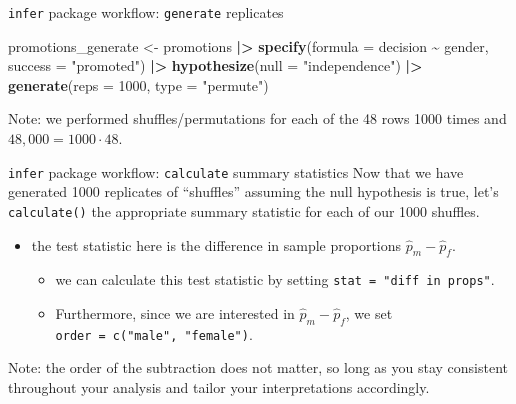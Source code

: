 \documentclass[
  ignorenonframetext,
]{beamer}
\newenvironment{Shaded}{\begin{snugshade}}{\end{snugshade}}
\newcommand{\AttributeTok}[1]{\textcolor[rgb]{0.13,0.29,0.53}{#1}}
\newcommand{\DecValTok}[1]{\textcolor[rgb]{0.00,0.00,0.81}{#1}}
\newcommand{\FunctionTok}[1]{\textcolor[rgb]{0.13,0.29,0.53}{\textbf{#1}}}
\newcommand{\NormalTok}[1]{#1}
\newcommand{\OtherTok}[1]{\textcolor[rgb]{0.56,0.35,0.01}{#1}}
\newcommand{\SpecialCharTok}[1]{\textcolor[rgb]{0.81,0.36,0.00}{\textbf{#1}}}
\newcommand{\StringTok}[1]{\textcolor[rgb]{0.31,0.60,0.02}{#1}}
\providecommand{\tightlist}{%
  \setlength{\itemsep}{0pt}\setlength{\parskip}{0pt}}
\begin{document}
\begin{frame}[fragile]{\texttt{infer} package workflow:
\texttt{generate} replicates}
\protect\hypertarget{infer-package-workflow-generate-replicates-1}{}
\begin{Shaded}
\begin{Highlighting}[]
\NormalTok{promotions\_generate }\OtherTok{\textless{}{-}}\NormalTok{ promotions }\SpecialCharTok{|\textgreater{}} 
  \FunctionTok{specify}\NormalTok{(}\AttributeTok{formula =}\NormalTok{ decision }\SpecialCharTok{\textasciitilde{}}\NormalTok{ gender, }
          \AttributeTok{success =} \StringTok{"promoted"}\NormalTok{) }\SpecialCharTok{|\textgreater{}} 
  \FunctionTok{hypothesize}\NormalTok{(}\AttributeTok{null =} \StringTok{"independence"}\NormalTok{) }\SpecialCharTok{|\textgreater{}} 
  \FunctionTok{generate}\NormalTok{(}\AttributeTok{reps =} \DecValTok{1000}\NormalTok{, }\AttributeTok{type =} \StringTok{"permute"}\NormalTok{)}
\end{Highlighting}
\end{Shaded}

Note: we performed shuffles/permutations for each of the 48 rows 1000
times and \(48,000=1000\cdot 48\).
\end{frame}

\begin{frame}[fragile]{\texttt{infer} package workflow:
\texttt{calculate} summary statistics}
\protect\hypertarget{infer-package-workflow-calculate-summary-statistics}{}
Now that we have generated 1000 replicates of ``shuffles'' assuming the
null hypothesis is true, let's \texttt{calculate()} the appropriate
summary statistic for each of our 1000 shuffles.

\begin{itemize}
\item
  the test statistic here is the difference in sample proportions
  \(\hat{p}_m-\hat{p}_f\).

  \begin{itemize}
  \tightlist
  \item
    we can calculate this test statistic by setting
    \texttt{stat\ =\ "diff\ in\ props"}.
  \item
    Furthermore, since we are interested in \(\hat{p}_m-\hat{p}_f\), we
    set \texttt{order\ =\ c("male",\ "female")}.
  \end{itemize}
\end{itemize}

Note: the order of the subtraction does not matter, so long as you stay
consistent throughout your analysis and tailor your interpretations
accordingly.
\end{frame}
\end{document}
